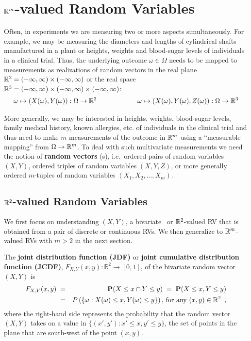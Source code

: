 \newpage

\section{$\mathbb{R}^m$-valued Random Variables}\label{S:RVecs}

Often, in experiments we are measuring two or more aspects simultaneously.  
For example, we may be measuring the diameters and lengths of cylindrical shafts manufactured in a plant or heights, weights and blood-sugar levels of individuals in a clinical trial.  
Thus, the underlying outcome $\omega \in \Omega$ needs to be mapped to measurements as realizations of random vectors in the real plane $\mathbb{R}^2 = (-\infty, \infty) \times (-\infty, \infty)$ or the real space $\mathbb{R}^3 = (-\infty, \infty) \times (-\infty, \infty) \times (-\infty, \infty)$:
\[
\omega \mapsto \left( X(\omega),Y(\omega) \right) : \Omega \to \mathbb{R}^2  \qquad \qquad \qquad \omega \mapsto \left( X(\omega),Y(\omega), Z(\omega) \right) : \Omega \to \mathbb{R}^3
\]

More generally, we may be interested in heights, weights, blood-sugar levels, family medical history, known allergies, etc. of individuals in the clinical trial and thus need to make $m$ measurements of the outcome in $\mathbb{R}^m$ using a ``measurable mapping'' from $\Omega \to \mathbb{R}^m$.  
To deal with such multivariate measurements we need the notion of {\bf random vectors} ({\rv}s), i.e.~ordered pairs of random variables $(X,Y)$, ordered triples of random variables $(X,Y,Z)$, or more generally ordered $m$-tuples of random variables $(X_1,X_2,\ldots,X_m)$.  

\subsection{$\mathbb{R}^2$-valued Random Variables}

We first focus on understanding $(X,Y)$, a bivariate \rv~or $\mathbb{R}^2$-valued RV that is obtained from a pair of discrete or continuous RVs.  
We then generalize to $\mathbb{R}^m$-valued RVs with $m>2$ in the next section.

\begin{definition}[JDF]\label{Df:JDF}
The {\bf joint distribution function (JDF)} or {\bf joint cumulative distribution function (JCDF)}, $F_{X,Y}(x,y):\mathbb{R}^2\to [0,1]$, of the bivariate random vector $(X,Y)$ is
\begin{eqnarray}\label{E:j2DF}
F_{X,Y}(x,y)\; 
&=& \mathbf{P}(X\leq x \cap Y \leq y) \;= \;\mathbf{P}(X\leq x , Y \leq y)\notag\\
&=& P\left( \{ \omega: X(\omega) \le x, Y(\omega) \le y \} \right) \mbox{, for any } (x,y) \in \mathbb{R}^2 \enspace ,
\end{eqnarray}
where the right-hand side represents the probability that the random vector $(X,Y)$ takes on a value in 
$\{(x',y'): x' \leq x, y' \leq y\}$, the set of points in the plane that are south-west of the point $(x,y)$.
\end{definition}

